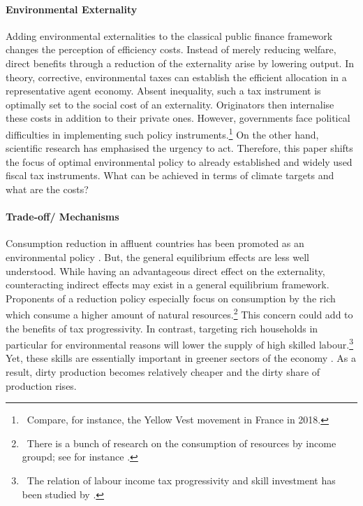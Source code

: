 \paragraph{Environmental Externality}
Adding environmental externalities to the classical public finance framework changes the perception of efficiency costs. Instead of merely reducing welfare, direct benefits through a reduction of the externality arise by lowering output. 
In theory, corrective, environmental taxes can establish the efficient allocation in a representative agent economy. Absent inequality, such a tax instrument is optimally set to the social cost of an externality. Originators then internalise these costs in addition to their private ones. However, governments face political difficulties in implementing such policy instruments.\footnote{\ Compare, for instance, the Yellow Vest movement in France in 2018.} On the other hand, scientific research has emphasised the urgency to act. Therefore, this paper shifts the focus of optimal environmental policy to already established and widely used fiscal tax instruments. What can be achieved in terms of climate targets and what are the costs?

\paragraph{Trade-off/ Mechanisms}
 Consumption reduction in affluent countries has been promoted as an environmental policy \citep{Schor2005SustainableReduction, Pullinger2014WorkingDesign, Arrow2004AreMuch}. But, the general equilibrium effects are less well understood.
While having an advantageous direct effect on the externality, counteracting indirect effects may exist in a general equilibrium framework. Proponents of a reduction policy especially focus on consumption by the rich which consume a higher amount of natural resources.\footnote{\ There is a bunch of research on the consumption of resources by income groupd; see for instance \cite{Sager2019IncomeCurves}.} %
This concern could add to the benefits of tax progressivity.
In contrast, targeting rich households in particular for environmental reasons will lower the supply of high skilled labour.\footnote{\ The relation of labour income tax progressivity and skill investment has been studied by \cite{Heathcote2017OptimalFramework}.} Yet, these skills are essentially important in greener sectors of the economy \citep{Consoli2016DoCapital}. As a result, dirty production becomes relatively cheaper and the dirty share of production rises. 

